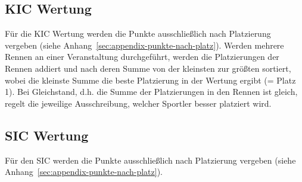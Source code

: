 \subsection{KIC Wertung}
Für die KIC Wertung werden die Punkte ausschließlich nach Platzierung vergeben (siehe Anhang~\ref{sec:appendix-punkte-nach-platz}). Werden mehrere Rennen an einer Veranstaltung durchgeführt, werden die Platzierungen der Rennen addiert und nach deren Summe von der kleinsten zur größten sortiert, wobei die kleinste Summe die beste Platzierung in der Wertung ergibt (= Platz 1). Bei Gleichstand, d.h. die Summe der Platzierungen in den Rennen ist gleich, regelt die jeweilige Ausschreibung, welcher Sportler besser platziert wird.

\subsection{SIC Wertung}
Für den SIC werden die Punkte ausschließlich nach Platzierung vergeben (siehe Anhang~\ref{sec:appendix-punkte-nach-platz}).